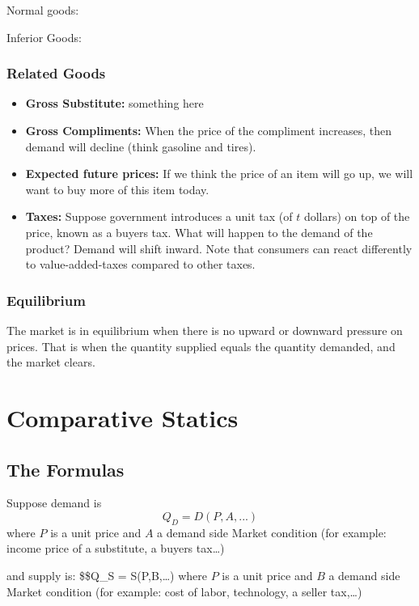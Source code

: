 \documentclass[
]{book}
\providecommand{\tightlist}{%
  \setlength{\itemsep}{0pt}\setlength{\parskip}{0pt}}
\begin{document}
Normal goods:

Inferior Goods:

\hypertarget{related-goods}{%
\subsubsection{Related Goods}\label{related-goods}}

\begin{itemize}
\tightlist
\item
  \textbf{Gross Substitute:} something here
\item
  \textbf{Gross Compliments:} When the price of the compliment increases, then demand will decline (think gasoline and tires).
\item
  \textbf{Expected future prices:} If we think the price of an item will go up, we will want to buy more of this item today.
\item
  \textbf{Taxes:} Suppose government introduces a unit tax (of \(t\) dollars) on top of the price, known as a buyers tax. What will happen to the demand of the product? Demand will shift inward. Note that consumers can react differently to value-added-taxes compared to other taxes.
\end{itemize}

\hypertarget{equilibrium}{%
\subsubsection{Equilibrium}\label{equilibrium}}

The market is in equilibrium when there is no upward or downward pressure on prices.
That is when the quantity supplied equals the quantity demanded, and the market clears.

\hypertarget{comparative-statics}{%
\section{Comparative Statics}\label{comparative-statics}}

\hypertarget{the-formulas}{%
\subsection{The Formulas}\label{the-formulas}}

Suppose demand is \[Q_D = D(P, A, ...)\]
where \(P\) is a unit price and \(A\) a demand side Market condition (for example: income price of a substitute, a buyers tax\ldots)

and supply is: \$\$Q\_S = S(P,B,\ldots) where \(P\) is a unit price and \(B\) a demand side Market condition (for example: cost of labor, technology, a seller tax,\ldots)
\end{document}
